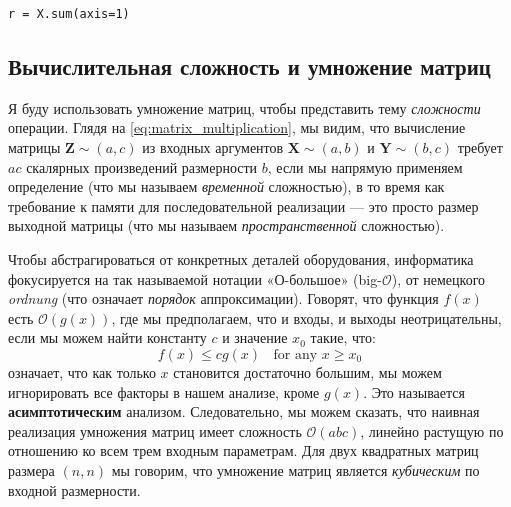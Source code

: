 {\small
\begin{center}\texttt{r = X.sum(axis=1)}\end{center}
}

\subsection*{Вычислительная сложность и умножение матриц \addteacup} 

Я буду использовать умножение матриц, чтобы представить тему \textit{сложности} операции. Глядя на \eqref{eq:matrix_multiplication}, мы видим, что вычисление матрицы $\mathbf{Z} \sim (a,c)$ из входных аргументов $\mathbf{X} \sim (a,b)$ и $\mathbf{Y} \sim (b,c)$ требует $ac$ скалярных произведений размерности $b$, если мы напрямую применяем определение (что мы называем \textit{временной} сложностью), в то время как требование к памяти для последовательной реализации — это просто размер выходной матрицы (что мы называем \textit{пространственной} сложностью).

Чтобы абстрагироваться от конкретных деталей оборудования, информатика фокусируется на так называемой нотации «О-большое» (big-$\mathcal{O}$), от немецкого \textit{ordnung} (что означает \textit{порядок} аппроксимации). Говорят, что функция $f(x)$ есть $\mathcal{O}(g(x))$, где мы предполагаем, что и входы, и выходы неотрицательны, если мы можем найти константу $c$ и значение $x_0$ такие, что:
%
\begin{equation}
f(x) \le cg(x) \;\; \text{ for any } x \ge x_0
\end{equation}
%
означает, что как только $x$ становится достаточно большим, мы можем игнорировать все факторы в нашем анализе, кроме $g(x)$. Это называется \textbf{асимптотическим} анализом. Следовательно, мы можем сказать, что наивная реализация умножения матриц имеет сложность $\mathcal{O}(abc)$, линейно растущую по отношению ко всем трем входным параметрам. Для двух квадратных матриц размера $(n,n)$ мы говорим, что умножение матриц является \textit{кубическим} по входной размерности.

